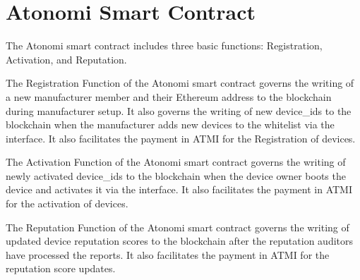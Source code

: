 \section{Atonomi Smart Contract}
The Atonomi smart contract includes three basic functions:
Registration, Activation, and Reputation.

The Registration Function of the Atonomi smart contract governs the writing
of a new manufacturer member and their Ethereum address to the blockchain
during manufacturer setup. It also governs the writing of new device_ids to
the blockchain when the manufacturer adds new devices to the whitelist
via the interface. It also facilitates the payment in ATMI for the
Registration of devices.


The Activation Function of the Atonomi smart contract governs the writing
of newly activated device_ids to the blockchain when the device owner boots
the device and activates it via the interface. It also facilitates the payment
in ATMI for the activation of devices.


The Reputation Function of the Atonomi smart contract governs the writing of
updated device reputation scores to the blockchain after the reputation
auditors have processed the reports. It also facilitates the payment in
ATMI for the reputation score updates.


